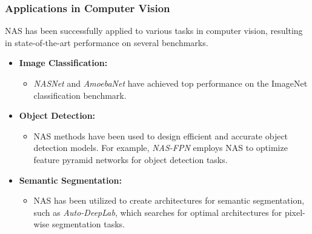 \documentclass[12pt]{article}
\begin{document}
\subsubsection{Applications in Computer Vision}
NAS has been successfully applied to various tasks in computer vision, resulting in state-of-the-art performance on several benchmarks.
\begin{itemize}
    \item \textbf{Image Classification:}
    \begin{itemize}
        \item \textit{NASNet} and \textit{AmoebaNet} have achieved top performance on the ImageNet classification benchmark.
    \end{itemize}
    \item \textbf{Object Detection:}
    \begin{itemize}
        \item NAS methods have been used to design efficient and accurate object detection models. For example, \textit{NAS-FPN} employs NAS to optimize feature pyramid networks for object detection tasks.
    \end{itemize}
    \item \textbf{Semantic Segmentation:}
    \begin{itemize}
        \item NAS has been utilized to create architectures for semantic segmentation, such as \textit{Auto-DeepLab}, which searches for optimal architectures for pixel-wise segmentation tasks.
    \end{itemize}
\end{itemize}
\end{document}

